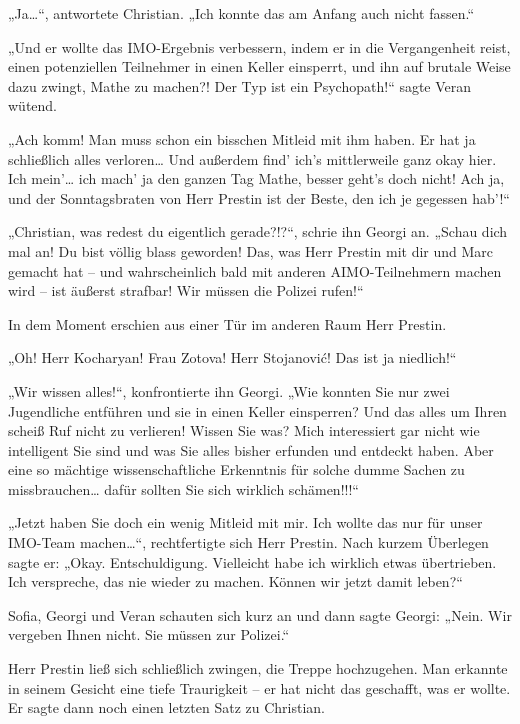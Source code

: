 \documentclass[oneside]{memoir}
\begin{document}
„Ja\ldots“, antwortete Christian. „Ich konnte das am Anfang auch nicht fassen.“

„Und er wollte das IMO-Ergebnis verbessern, indem er in die Vergangenheit reist, einen potenziellen Teilnehmer in einen Keller einsperrt, und ihn auf brutale Weise dazu zwingt, Mathe zu machen?! Der Typ ist ein Psychopath!“ sagte Veran wütend.

„Ach komm! Man muss schon ein bisschen Mitleid mit ihm haben. Er hat ja schließlich alles verloren\ldots{} Und außerdem find' ich's mittlerweile ganz okay hier. Ich mein'\ldots{} ich mach' ja den ganzen Tag Mathe, besser geht’s doch nicht!
Ach ja, und der Sonntagsbraten von Herr Prestin ist der Beste, den ich je gegessen hab'!“

„Christian, was redest du eigentlich gerade?!?“, schrie ihn Georgi an. „Schau dich mal an! Du bist völlig blass geworden! Das, was Herr Prestin mit dir und Marc gemacht hat -- und wahrscheinlich bald mit anderen AIMO-Teilnehmern machen wird -- ist äußerst strafbar! Wir müssen die Polizei rufen!“

In dem Moment erschien aus einer Tür im anderen Raum Herr Prestin.

„Oh! Herr Kocharyan! Frau Zotova! Herr Stojanović! Das ist ja niedlich!“

„Wir wissen alles!“, konfrontierte ihn Georgi. „Wie konnten Sie nur zwei Jugendliche entführen und sie in einen Keller einsperren? Und das alles um Ihren scheiß Ruf nicht zu verlieren! Wissen Sie was? Mich interessiert gar nicht wie intelligent Sie sind und was Sie alles bisher erfunden und entdeckt haben. Aber eine so mächtige wissenschaftliche Erkenntnis für solche dumme Sachen zu missbrauchen\ldots{} dafür sollten Sie sich wirklich schämen!!!“

„Jetzt haben Sie doch ein wenig Mitleid mit mir. Ich wollte das nur für unser IMO-Team machen\ldots“, rechtfertigte sich Herr Prestin. Nach kurzem Überlegen sagte er: „Okay. Entschuldigung. Vielleicht habe ich wirklich etwas übertrieben. Ich verspreche, das nie wieder zu machen. Können wir jetzt damit leben?“

Sofia, Georgi und Veran schauten sich kurz an und dann sagte Georgi: 
„Nein. Wir vergeben Ihnen nicht. Sie müssen zur Polizei.“

Herr Prestin ließ sich schließlich zwingen, die Treppe hochzugehen. Man erkannte in seinem Gesicht eine tiefe Traurigkeit -- er hat nicht das geschafft, was er wollte. Er sagte dann noch einen letzten Satz zu Christian.
\end{document}
